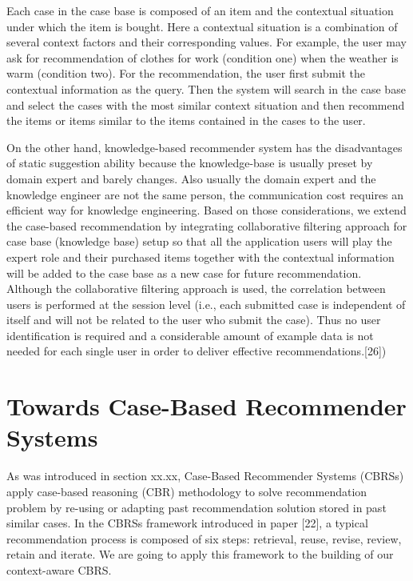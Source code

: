 Each case in the case base is composed of an item and the contextual situation under which the item is bought. Here a contextual situation is a combination of several context factors and their corresponding values. For example, the user may ask for recommendation of clothes for work (condition one) when the weather is warm (condition two). For the recommendation, the user first submit the contextual information as the query. Then the system will search in the case base and select the cases with the most similar context situation and then recommend the items or items similar to the items contained in the cases to the user. 

On the other hand, knowledge-based recommender system has the disadvantages of static suggestion ability because the knowledge-base is usually preset by domain expert and barely changes. Also usually the domain expert and the knowledge engineer are not the same person, the communication cost requires an efficient way for knowledge engineering. Based on those considerations, we extend the case-based recommendation by integrating collaborative filtering approach for case base (knowledge base) setup so that all the application users will play the expert role and their purchased items together with the contextual information will be added to the case base as a new case for future recommendation. Although the collaborative filtering approach is used, the correlation between users is performed at the session level (i.e., each submitted case is independent of itself and will not be related to the user who submit the case). Thus no user identification is required and a considerable amount of example data is not needed for each single user in order to deliver effective recommendations.[26])

\section{Towards Case-Based Recommender Systems} \label{sec:tcbrs}

As was introduced in section xx.xx, Case-Based Recommender Systems (CBRSs) apply case-based reasoning (CBR) methodology to solve recommendation problem by re-using or adapting past recommendation solution stored in past similar cases. In the CBRSs framework introduced in paper [22], a typical recommendation process is composed of six steps: retrieval, reuse, revise, review, retain and iterate. We are going to apply this framework to the building of our context-aware CBRS.

